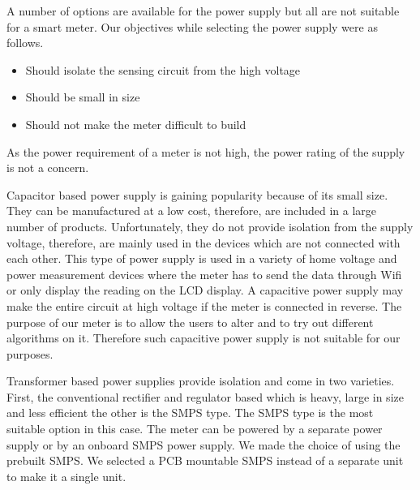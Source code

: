 A number of options are available for the power supply but all are not suitable for a smart meter. Our objectives while selecting the power supply were as follows.

\begin{itemize}
\item Should isolate the sensing circuit from the high voltage
\item Should be small in size
\item Should not make the meter difficult to build
\end{itemize}

As the power requirement of a meter is not high, the power rating of the supply is not a concern.

Capacitor based power supply is gaining popularity because of its small size. They can be manufactured at a low cost, therefore, are included in a large number of products. Unfortunately, they do not provide isolation from the supply voltage, therefore, are mainly used in the devices which are not connected with each other. This type of power supply is used in a variety of home voltage and power measurement devices where the meter has to send the data through Wifi or only display the reading on the LCD display. A capacitive power supply may make the entire circuit at high voltage if the meter is connected in reverse. The purpose of our meter is to allow the users to alter and to try out different algorithms on it. Therefore such capacitive power supply is not suitable for our purposes.

Transformer based power supplies provide isolation and come in two varieties. First, the conventional rectifier and regulator based which is heavy, large in size and less efficient the other is the SMPS type. The SMPS type is the most suitable option in this case. The meter can be powered by a separate power supply or by an onboard SMPS power supply. We made the choice of using the prebuilt SMPS.
We selected a PCB mountable SMPS instead of a separate unit to make it a single unit.
